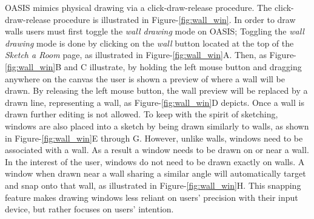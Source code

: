 OASIS mimics physical drawing via a click-draw-release procedure.
The click-draw-release procedure is illustrated in Figure-\ref{fig:wall_win}.
In order to draw walls users must first toggle the \textit{wall drawing} mode on OASIS;
Toggling the \textit{wall drawing} mode is done by clicking on the \textit{wall} button located at the top of the \textit{Sketch a Room} page, as illustrated in Figure-\ref{fig:wall_win}A.
Then, as Figure-\ref{fig:wall_win}B and C illustrate, by holding the left mouse button and dragging anywhere on the canvas the user is shown a preview of where a wall will be drawn.
By releasing the left mouse button, the wall preview will be replaced by a drawn line, representing a wall, as Figure-\ref{fig:wall_win}D depicts.
Once a wall is drawn further editing is not allowed.
To keep with the spirit of sketching, windows are also placed into a sketch by being drawn similarly to walls, as shown in Figure-\ref{fig:wall_win}E through G.
However, unlike walls, windows need to be associated with a wall.
As a result a window needs to be drawn on or near a wall.
In the interest of the user, windows do not need to be drawn exactly on walls.
A window when drawn near a wall sharing a similar angle will automatically target and snap onto that wall, as illustrated in Figure-\ref{fig:wall_win}H.
This snapping feature makes drawing windows less reliant on users' precision with their input device, but rather focuses on users' intention. \\

